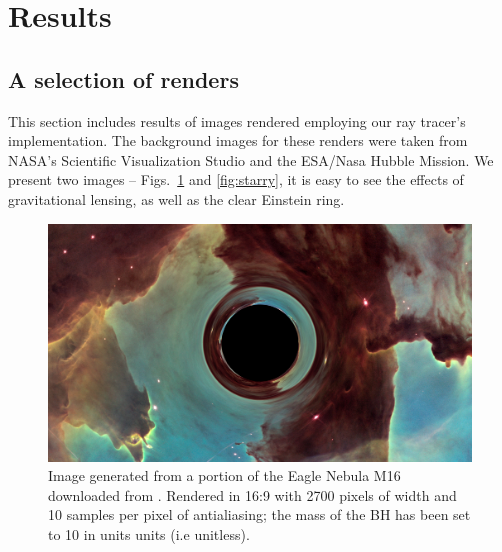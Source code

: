 \section{Results}
\label{sec:results}

\subsection{A selection of renders}

This section includes results of images rendered employing our ray tracer's implementation.
The background images for these renders were taken from NASA's Scientific Visualization Studio and the ESA/Nasa Hubble Mission.
We present two images -- Figs.~\ref{fig:eagle} and \ref{fig:starry}, it is easy to see the effects of gravitational lensing, as well as the clear Einstein ring. 

\begin{figure}[h]
  \centering
  \includegraphics[width=0.8\linewidth]{figs/eagle_render}
  \caption{Image generated from a portion of the Eagle Nebula M16 downloaded from \cite{esa-pillars}.
	Rendered in 16:9 with 2700 pixels of width and 10 samples per pixel of antialiasing;
	the mass of the BH has been set to 10 in units units (i.e unitless).
	}
  \label{fig:eagle}
\end{figure}



